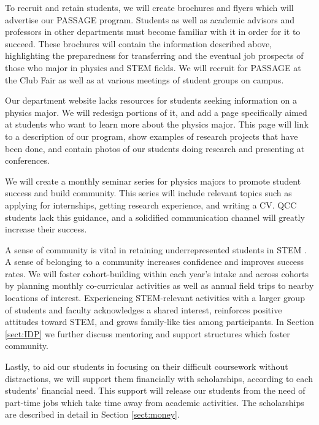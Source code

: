 \documentclass[12pt]{article}
\begin{document}
To recruit and retain students, we will create brochures and flyers which will advertise our PASSAGE program.  Students as well as academic advisors and professors in other departments must become familiar with it in order for it to succeed.  These brochures will contain the information described above, highlighting the preparedness for transferring and the eventual job prospects of those who major in physics and STEM fields.  We will recruit for PASSAGE at the Club Fair as well as at various meetings of student groups on campus.

Our department website lacks resources for students seeking information on a physics major.  We will redesign portions of it, and add a page specifically aimed at students who want to learn more about the physics major.  This page will link to a description of our program, show examples of research projects that have been done, and contain photos of our students doing research and presenting at conferences.
	
We will create a monthly seminar series for physics majors to promote student success and build community.  This series will include relevant topics such as applying for internships, getting research experience, and writing a CV.  QCC students lack this guidance, and a solidified communication channel will greatly increase their success.

A sense of community is vital in retaining underrepresented students in STEM \citep[][and references therein]{NAP25257}.  A sense of belonging to a community increases confidence and improves success rates.  We will foster cohort-building within each year's intake and across cohorts by planning monthly co-curricular activities as well as annual field trips to nearby locations of interest.  Experiencing STEM-relevant activities with a larger group of students and faculty acknowledges a shared interest, reinforces positive attitudes toward STEM, and grows family-like ties among participants.  In Section \ref{sect:IDP} we further discuss mentoring and support structures which foster community.

Lastly, to aid our students in focusing on their difficult coursework without distractions, we will support them financially with scholarships, according to each students' financial need.  This support will release our students from the need of part-time jobs which take time away from academic activities.  The scholarships are described in detail in Section \ref{sect:money}.
\end{document}

